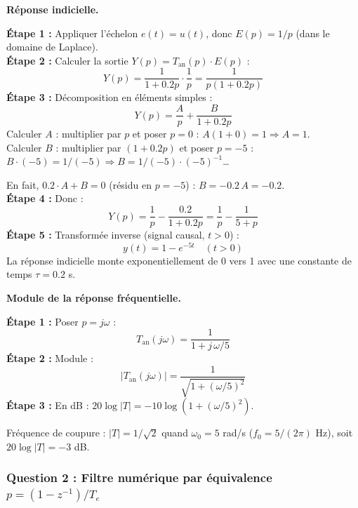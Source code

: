 \documentclass[12pt,a4paper]{article}
\newcommand{\step}[1]{\textcolor{coursbleu}{\textbf{Étape #1 :}}}
\newcommand{\encadre}[1]{\boxed{#1}}
\begin{document}
\begin{tcolorbox}[corrbox, title=Correction Q1]
\textbf{Réponse indicielle.}

\step{1} Appliquer l'échelon $e(t) = u(t)$, donc $E(p) = 1/p$ (dans le domaine de Laplace).\\[4pt]
\step{2} Calculer la sortie $Y(p) = T_{\text{an}}(p)\cdot E(p)$ :
\[
  Y(p) = \frac{1}{1+0.2p}\cdot\frac{1}{p} = \frac{1}{p(1+0.2p)}
\]
\step{3} Décomposition en éléments simples :
\[
  Y(p) = \frac{A}{p} + \frac{B}{1+0.2p}
\]
Calculer $A$ : multiplier par $p$ et poser $p=0$ :
$A(1+0) = 1 \Rightarrow A = 1$.\\
Calculer $B$ : multiplier par $(1+0.2p)$ et poser $p = -5$ :
$B\cdot(-5) = 1/(-5) \Rightarrow B = 1/(-5)\cdot(-5)^{-1}$\ldots

En fait, $0.2\cdot A + B = 0$ (résidu en $p=-5$) :
$B = -0.2\,A = -0.2$.\\[4pt]
\step{4} Donc :
\[
  Y(p) = \frac{1}{p} - \frac{0.2}{1+0.2p}
       = \frac{1}{p} - \frac{1}{5+p}
\]
\step{5} Transformée inverse (signal causal, $t>0$) :
\[
  \encadre{y(t) = 1 - e^{-5t}} \quad (t > 0)
\]
La réponse indicielle monte exponentiellement de 0 vers 1 avec une constante de temps $\tau = 0.2$ s.

\bigskip
\textbf{Module de la réponse fréquentielle.}

\step{1} Poser $p = j\omega$ :
\[
  T_{\text{an}}(j\omega) = \frac{1}{1 + j\,\omega/5}
\]
\step{2} Module :
\[
  |T_{\text{an}}(j\omega)| = \frac{1}{\sqrt{1 + (\omega/5)^2}}
\]
\step{3} En dB : $20\log|T| = -10\log(1 + (\omega/5)^2)$.

Fréquence de coupure : $|T| = 1/\sqrt{2}$ quand $\omega_0 = 5$ rad/s ($f_0 = 5/(2\pi)$ Hz),
soit $20\log|T| = -3$ dB.
\end{tcolorbox}

\subsubsection*{Question 2 : Filtre numérique par équivalence $p = (1-z^{-1})/T_e$}
\end{document}
